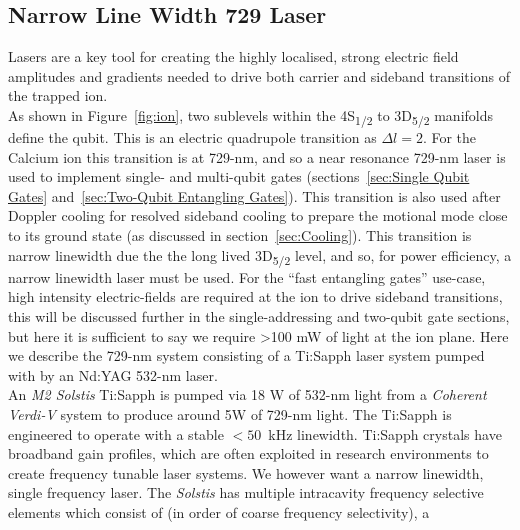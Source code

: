     
\subsection{Narrow Line Width 729 Laser}
\label{sec:Narrow Line Width 729 Laser} 

    Lasers are a key tool for creating the highly localised, strong electric
    field amplitudes and gradients needed to drive both carrier and sideband
    transitions of the trapped ion.\\ As shown in Figure~\ref{fig:ion}, 
    two sublevels within the 4S\textsubscript{1/2} to 3D\textsubscript{5/2}
    manifolds define the qubit. This is an electric quadrupole transition as
    $\Delta l = 2$.  For the Calcium ion this transition is at 729-nm, and so 
    a near resonance 729-nm laser is used to implement single- and multi-qubit gates
    (sections~\ref{sec:Single Qubit Gates} and~\ref{sec:Two-Qubit
    Entangling Gates}). This transition is also used after Doppler cooling for
    resolved sideband cooling to prepare the motional mode close to its ground
    state (as discussed in section~\ref{sec:Cooling}).
    This transition is narrow linewidth due the the long lived
    3D\textsubscript{5/2} level, and so, for power efficiency, a
    narrow linewidth laser must be used. For the ``fast entangling gates'' use-case, high intensity electric-fields are required at the ion to drive sideband
    transitions, this will be discussed further in the single-addressing and
    two-qubit gate sections, but here it is sufficient to say we require >100 mW
    of light at the ion plane.  Here we describe the 729-nm system 
    consisting of a Ti:Sapph laser system pumped with by an Nd:YAG 532-nm laser.\\
    An \emph{M2 Solstis} Ti:Sapph is pumped via 18 W of 532-nm light
    from a \emph{Coherent Verdi-V} system to produce around 5W of
    729-nm light.  The Ti:Sapph is engineered to operate with a stable $<50$~kHz
    linewidth. Ti:Sapph crystals have broadband gain profiles, which
    are often exploited in research environments to create frequency tunable
    laser systems. We however want a narrow linewidth, single frequency laser.
    The \emph{Solstis} has multiple intracavity frequency selective
    elements which consist of (in order of coarse frequency selectivity), a

